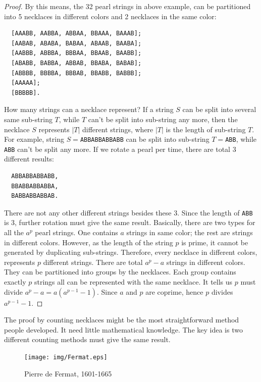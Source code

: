 \documentclass{article}
\begin{document}
\begin{proof}
By this means, the 32 pearl strings in above example, can be partitioned into 5 necklaces in different colors and 2 necklaces in the same color:

\begin{verbatim}
  [AAABB, AABBA, ABBAA, BBAAA, BAAAB];
  [AABAB, ABABA, BABAA, ABAAB, BAABA];
  [AABBB, ABBBA, BBBAA, BBAAB, BAABB];
  [ABABB, BABBA, ABBAB, BBABA, BABAB];
  [ABBBB, BBBBA, BBBAB, BBABB, BABBB];
  [AAAAA];
  [BBBBB].
\end{verbatim}

How many strings can a necklace represent? If a string $S$ can be split into several same sub-string $T$, while $T$ can't be split into sub-string any more, then the necklace $S$ represents $|T|$ different strings, where $|T|$ is the length of sub-string $T$. For example, string $S=$\texttt{ABBABBABBABB} can be split into sub-string $T=$\texttt{ABB}, while \texttt{ABB} can't be split any more. If we rotate a pearl per time, there are total 3 different results:

\begin{verbatim}
  ABBABBABBABB,
  BBABBABBABBA,
  BABBABBABBAB.
\end{verbatim}

There are not any other different strings besides these 3. Since the length of \texttt{ABB} is 3, further rotation must give the same result. Basically, there are two types for all the $a^p$ pearl strings. One contains $a$ strings in same color; the rest are strings in different colors. However, as the length of the string $p$ is prime, it cannot be generated by duplicating sub-strings. Therefore, every necklace in different colors, represents $p$ different strings. There are total $a^p -a$ strings in different colors. They can be partitioned into groups by the necklaces. Each group contains exactly $p$ strings all can be represented with the same necklace. It tells us $p$ must divide $a^p-a = a(a^{p-1}-1)$. Since $a$ and $p$ are coprime, hence $p$ divides $a^{p-1}-1$.

\end{proof}

The proof by counting necklaces might be the most straightforward method people developed. It need little mathematical knowledge. The key idea is two different counting methods must give the same result.

\begin{figure}
  \centering %
 \texttt{[image: img/Fermat.eps]}
 \captionsetup{labelformat=empty}
 \caption{Pierre de Fermat, 1601-1665}
 \label{fig:Fermat}
\end{figure}
\end{document}

